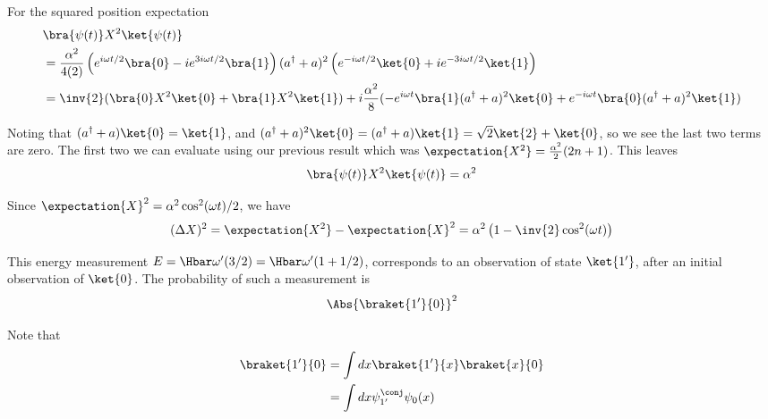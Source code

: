 {For the squared position expectation
\begin{equation}\label{eqn:qmIexamPractice:770}
\begin{aligned}
&\bra{\psi(t)} X^2 \ket{\psi(t)} \\
&=
\frac{\alpha^2}{4 (2)}
\left(
e^{i \omega t/2 } \bra{0}
- i e^{ 3 i \omega t/2 } \bra{1}
\right)
(a^\dagger + a)^2
\left(
e^{-i \omega t/2 } \ket{0}
+ i e^{- 3 i \omega t/2 } \ket{1}
\right) \\
&=
\inv{2} ( \bra{0} X^2 \ket{0} + \bra{1} X^2 \ket{1} )
+ i \frac{\alpha^2 }{8} (
- e^{ i \omega t} \bra{1} (a^\dagger + a)^2 \ket{0}
+ e^{ -i \omega t} \bra{0} (a^\dagger + a)^2 \ket{1}
)
\end{aligned}
\end{equation}

Noting that \((a^\dagger + a) \ket{0} = \ket{1}\), and \((a^\dagger + a)^2 \ket{0} = (a^\dagger + a)\ket{1} = \sqrt{2} \ket{2} + \ket{0}\), so we see the last two terms are zero.  The first two we can evaluate using our previous result  which was \(\expectation{X^2} = \frac{\alpha^2}{2} (2n + 1)\).  This leaves
%
\begin{equation}\label{eqn:qmIexamPractice2008Dec:3:330}
\bra{\psi(t)} X^2 \ket{\psi(t)} = \alpha^2
\end{equation}

Since \(\expectation{X}^2 = \alpha^2 \cos^2(\omega t)/2\), we have
%
\begin{equation}\label{eqn:qmIexamPractice2008Dec:3:340}
(\Delta X)^2 = \expectation{X^2} - \expectation{X}^2 = \alpha^2 \left(1 - \inv{2} \cos^2(\omega t) \right)
\end{equation}


This energy measurement \(E = \Hbar \omega' (3/2) = \Hbar \omega' (1 + 1/2)\), corresponds to an observation of state \(\ket{1'}\), after an initial observation of \(\ket{0}\).  The probability of such a measurement is
%
\begin{equation}\label{eqn:qmIexamPractice2008Dec:3:400}
\Abs{ \braket{1'}{0} }^2
\end{equation}

Note that
%
\begin{equation}\label{eqn:qmIexamPractice:790}
\begin{aligned}
\braket{1'}{0}
&=
\int dx \braket{1'}{x}\braket{x}{0} \\
&=
\int dx \psi_{1'}^\conj \psi_0(x) \\
\end{aligned}
\end{equation}

}
